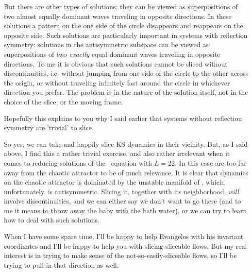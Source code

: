 \begin{description}
    But there are other types of solutions: they can be viewed as superpositions of two almost equally dominant waves traveling in opposite directions.  In these solutions a pattern on the one side of the circle disappears and reappears on the opposite side.  Such solutions are particularly important in systems with reflection symmetry: solutions in the antisymmetric subspace can be viewed as superpositions of two {\em exactly} equal dominant waves traveling in opposite directions.  To me it is obvious that such solutions cannot be sliced without discontinuities, i.e. without jumping from one side of the circle to the other across the origin, or without traveling infinitely fast around the circle in whichever direction you prefer.  The problem is in the nature of the solution itself, not in the choice of the slice, or the moving frame.

    Hopefully this explains to you why I said earlier that systems without reflection symmetry are 'trivial' to slice.

    So yes, we can take  and happily slice KS dynamics in their vicinity.  But, as I said above, I find this a rather trivial exercise, and also rather irrelevant when it comes to reducing solutions of the \KS\ equation with $L = 22$.  In this case  are too far away from the chaotic attractor to be of much relevance.  It is clear that dynamics on the chaotic attractor is dominated by the unstable manifold of , which, unfortunately, is antisymmetric.  Slicing it, together with its neighborhood, {\em will} involve discontinuities, and we can either say we don't want to go there (and to me it means to throw away the baby with the bath water), or we can try to learn how to deal with such solutions.

    When I have some spare time, I'll be happy to help Evangelos with his invariant coordinates and I'll be happy to help you with slicing sliceable flows.  But my real interest is in trying to make sense of the not-so-easily-sliceable flows, so I'll be trying to pull in that direction as well.

\end{description}

\renewcommand{\ssp}{a}
